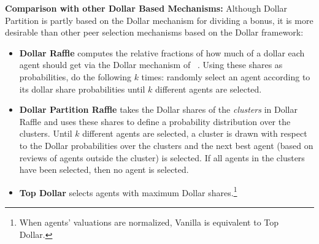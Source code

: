 \documentclass[letterpaper]{article}
\newcommand{\haris}[1]{\textcolor{green}{\textbf{Haris Says: #1}}}
\newcommand{\citet}[1]{\citeauthor{#1}~\shortcite{#1}}
\begin{document}
%
%
%
%

\smallskip
\noindent
\textbf{Comparison with other Dollar Based Mechanisms:}\;
Although Dollar Partition is partly based on the Dollar mechanism for dividing a bonus, it is more desirable than other peer selection mechanisms based on the Dollar framework:
\begin{itemize}[leftmargin=*]
	\setlength\itemsep{0em}
\item \textbf{Dollar Raffle} computes the relative fractions of how much of a dollar each agent should get via the Dollar mechanism of \citet{CMT08a}. Using these shares as probabilities, do the following $k$ times: randomly select an agent according to its dollar share probabilities until $k$ different agents are selected.
\item \textbf{Dollar Partition Raffle} takes the Dollar shares of the \emph{clusters} in Dollar Raffle and uses these shares to define a probability distribution over the clusters. Until $k$ different agents are selected, a cluster is drawn with respect to the Dollar probabilities over the clusters and the next best agent (based on reviews of agents outside the cluster) is selected. If all agents in the clusters have been selected, then no agent is selected.
\item \textbf{Top Dollar} selects agents with maximum Dollar shares.\footnote{When agents' valuations are normalized, Vanilla is equivalent to Top Dollar.}
\end{itemize}
\end{document}
